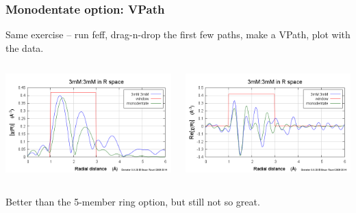 \documentclass[10pt, xcolor=x11names, compress]{beamer}
\begin{document}
\begin{frame}[fragile]
\begin{columns}
\begin{column}{0.5\linewidth}
    \end{column}  
  \end{columns}
\end{frame}

\begin{frame}
  \frametitle{Monodentate option: VPath}

  Same exercise -- run {feff}, drag-n-drop the first few paths, make
  a VPath, plot with the data.

  \bigskip

  \begin{columns}
    \begin{column}{0.5\linewidth}
      \includegraphics[width=\linewidth]{images/monodentate_chirmag.png}
    \end{column}
    \begin{column}{0.5\linewidth}
      \includegraphics[width=\linewidth]{images/monodentate_chirre.png}
    \end{column}
  \end{columns}
  
  \bigskip

  \begin{alertblock}{}
    \centering Better than the 5-member ring option, but still not so great.
  \end{alertblock}
\end{frame}
\end{document}
